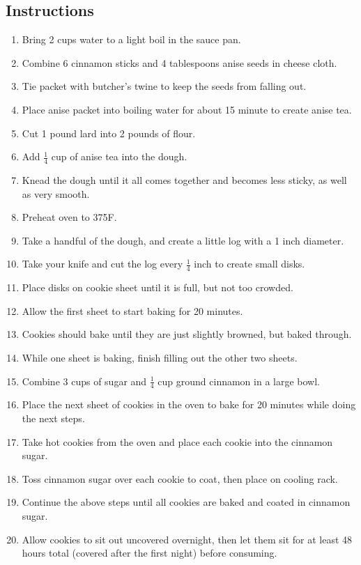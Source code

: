 \begin{multicols}{2}
\subsection*{Instructions}
\begin{enumerate}
    \item Bring 2 cups water to a light boil in the sauce pan.
    \item Combine 6 cinnamon sticks and 4 tablespoons anise seeds in cheese cloth.
    \item Tie packet with butcher's twine to keep the seeds from falling out.
    \item Place anise packet into boiling water for about 15 minute to create anise tea.
    \item Cut 1 pound lard into 2 pounds of flour.
    \item Add \( \frac{1}{4} \) cup of anise tea into the dough.
    \item Knead the dough until it all comes together and becomes less sticky, as well as very smooth.
    \item Preheat oven to 375F.
    \item Take a handful of the dough, and create a little log with a 1 inch diameter.
    \item Take your knife and cut the log every \( \frac{1}{4} \) inch to create small disks.
    \item Place disks on cookie sheet until it is full, but not too crowded.
    \item Allow the first sheet to start baking for 20 minutes.
    \item Cookies should bake until they are just slightly browned, but baked through.
    \item While one sheet is baking, finish filling out the other two sheets.
    \item Combine 3 cups of sugar and \( \frac{1}{4} \) cup ground cinnamon in a large bowl.
    \item Place the next sheet of cookies in the oven to bake for 20 minutes while doing the next steps.
    \item Take hot cookies from the oven and place each cookie into the cinnamon sugar.
    \item Toss cinnamon sugar over each cookie to coat, then place on cooling rack.
    \item Continue the above steps until all cookies are baked and coated in cinnamon sugar.
    \item Allow cookies to sit out uncovered overnight, then let them sit for at least 48 hours total (covered after the first night) before consuming.
\end{enumerate}


\end{multicols}
